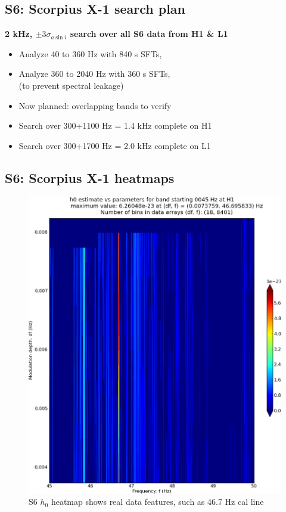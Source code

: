 \subsection{S6: Scorpius X-1 search plan}

\textbf{2 kHz, $\pm 3 \sigma_{a \sin i}$ search over all S6 data from H1 \& L1}
\begin{itemize}
\item Analyze 40 to 360 Hz with 840 s SFTs,
\item Analyze 360 to 2040 Hz with 360 s SFTs,\\
(to prevent spectral leakage)
\item Now planned: overlapping bands to verify
\item Search over 300+1100 Hz = 1.4 kHz complete on H1
\item Search over 300+1700 Hz = 2.0 kHz complete on L1
\end{itemize}


\subsection{S6: Scorpius X-1 heatmaps}

\begin{figure}
\begin{center}
\includegraphics[width=0.5\paperwidth,height=0.35\paperheight]{plots/DFvsFresultsh0-H1_pulsar-0045.eps}
\caption{
S6 $h_0$ heatmap shows real data features, such as 46.7 Hz cal line}
\end{center}
\end{figure}

